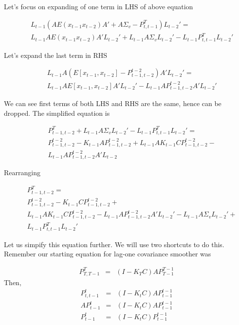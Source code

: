 \documentclass[12pt]{report}
\begin{document}
Let's focus on expanding of one term in LHS of above equation

\begin{eqnarray*}
&& L_{t-1}(A E(x_{t-1}x_{t-2})A' + A\Sigma_v - P_{t,t-1}^T ) L_{t-2}' = \\
&&  L_{t-1}A E(x_{t-1}x_{t-2})A' L_{t-2}' + L_{t-1}A\Sigma_vL_{t-2}' 
  - L_{t-1}P_{t,t-1}^TL_{t-2}'
\end{eqnarray*}

Let's expand the last term in RHS 

\begin{eqnarray*}
&& L_{t-1}A (E[x_{t-1},x_{t-2}] - P_{t-1,t-2}^{t-2})A'L_{t-2}' = \\
&& L_{t-1}AE[x_{t-1},x_{t-2}]A'L_{t-2}' - L_{t-1}A P_{t-1,t-2}^{t-2}A'L_{t-2}' 
\end{eqnarray*}

We can see first terms of both LHS and RHS are the same, hence can be
dropped. The simplified equation is

\begin{eqnarray*}
&& P_{t-1,t-2}^T + L_{t-1}A\Sigma_vL_{t-2}' - L_{t-1}P_{t,t-1}^TL_{t-2}' = \\
&& P_{t-1,t-2}^{t-2} - K_{t-1}AP_{t-1,t-2}^{t-2} + L_{t-1}AK_{t-1}CP_{t-1,t-2}^{t-2} - \\
&& L_{t-1}AP_{t-1,t-2}^{t-2}A'L_{t-2}
\end{eqnarray*}

Rearranging

\begin{eqnarray}
&& P_{t-1,t-2}^T = \label{eq10} \\
&& P_{t-1,t-2}^{t-2} - K_{t-1}CP_{t-1,t-2}^{t-2} + \nonumber \\
&& L_{t-1}AK_{t-1}CP_{t-1,t-2}^{t-2} - L_{t-1}AP_{t-1,t-2}^{t-2}A'L_{t-2}' - L_{t-1}A\Sigma_vL_{t-2}'+\nonumber\\
&& L_{t-1}P_{t,t-1}^TL_{t-2}'\nonumber
\end{eqnarray}

Let us simpify this equation further. We will use two shortcuts to do
this. Remember our starting equation for lag-one covariance smoother was

\begin{eqnarray*}
P_{T,T-1}^T &=& (I  - K_T C)AP_{T-1}^{T-1}
\end{eqnarray*}
Then,
\begin{eqnarray*}
P_{t,t-1}^t &=& (I  - K_t C)AP_{t-1}^{t-1}\\
AP_{t-1}^t &=& (I  - K_t C)AP_{t-1}^{t-1}\\
P_{t-1}^t &=& (I  - K_t C)P_{t-1}^{t-1}
\end{eqnarray*}
\end{document}
